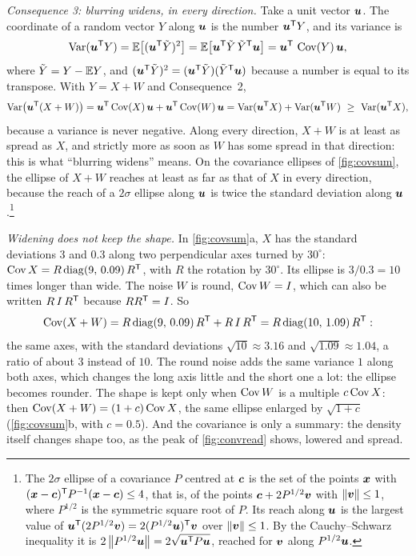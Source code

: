 \emph{Consequence 3: blurring widens, in every direction.} Take a unit
vector $\bm{u}$. The coordinate of a random vector $Y$ along $\bm{u}$ is
the number $\bm{u}^{\mathsf{T}} Y$, and its variance is
\[
  \operatorname{Var}(\bm{u}^{\mathsf{T}} Y)=\mathbb{E}\bigl[(\bm{u}^{\mathsf{T}}\tilde Y)^2\bigr]
  =\mathbb{E}\bigl[\bm{u}^{\mathsf{T}}\tilde Y\,\tilde Y^{\mathsf{T}}\bm{u}\bigr]
  =\bm{u}^{\mathsf{T}}\,\operatorname{Cov}(Y)\,\bm{u} ,
\]
where $\tilde Y=Y-\mathbb{E} Y$, and $(\bm{u}^{\mathsf{T}}\tilde Y)^2=(\bm{u}^{\mathsf{T}}\tilde
Y)(\tilde Y^{\mathsf{T}}\bm{u})$ because a number is equal to its transpose. With
$Y=X+W$ and Consequence~2,
\[
  \operatorname{Var}\bigl(\bm{u}^{\mathsf{T}}(X+W)\bigr)
  =\bm{u}^{\mathsf{T}}\operatorname{Cov}(X)\,\bm{u}+\bm{u}^{\mathsf{T}}\operatorname{Cov}(W)\,\bm{u}
  =\operatorname{Var}(\bm{u}^{\mathsf{T}} X)+\operatorname{Var}(\bm{u}^{\mathsf{T}} W)\ \ge\ \operatorname{Var}(\bm{u}^{\mathsf{T}} X),
\]
because a variance is never negative. Along every direction, $X+W$ is at
least as spread as $X$, and strictly more as soon as $W$ has some spread
in that direction: this is what ``blurring widens'' means. On the
covariance ellipses of \cref{fig:covsum}, the ellipse of $X+W$ reaches at
least as far as that of $X$ in every direction, because the reach of a
$2\sigma$ ellipse along $\bm{u}$ is twice the standard deviation along
$\bm{u}$.\footnote{The $2\sigma$ ellipse of a covariance $P$ centred at
$\bm{c}$ is the set of the points $\bm{x}$ with
$(\bm{x}-\bm{c})^{\mathsf{T}} P^{-1}(\bm{x}-\bm{c})\le4$, that is, of the
points $\bm{c}+2P^{1/2}\bm{v}$ with $\left\lVert \bm{v}\right\rVert\le1$, where
$P^{1/2}$ is the symmetric square root of $P$. Its reach along $\bm{u}$
is the largest value of $\bm{u}^{\mathsf{T}}(2P^{1/2}\bm{v})=2(P^{1/2}\bm{u})^{\mathsf{T}}\bm{v}$ over $\left\lVert \bm{v}\right\rVert\le1$. By the Cauchy--Schwarz
inequality it is $2\left\lVert P^{1/2}\bm{u}\right\rVert=2\sqrt{\bm{u}^{\mathsf{T}} P\bm{u}}$,
reached for $\bm{v}$ along $P^{1/2}\bm{u}$.}

\emph{Widening does not keep the shape.} In \cref{fig:covsum}a, $X$ has
the standard deviations $3$ and $0.3$ along two perpendicular axes turned
by $30^\circ$: $\operatorname{Cov} X=R\,\mathrm{diag}(9,\,0.09)\,R^{\mathsf{T}}$, with $R$ the
rotation by $30^\circ$. Its ellipse is $3/0.3=10$ times longer than wide.
The noise $W$ is round, $\operatorname{Cov} W=I$, which can also be written $R\,I\,R^{\mathsf{T}}$
because $RR^{\mathsf{T}}=I$. So
\[
  \operatorname{Cov}(X+W)=R\,\mathrm{diag}(9,\,0.09)\,R^{\mathsf{T}}+R\,I\,R^{\mathsf{T}}
  =R\,\mathrm{diag}(10,\,1.09)\,R^{\mathsf{T}} :
\]
the same axes, with the standard deviations $\sqrt{10}\approx3.16$ and
$\sqrt{1.09}\approx1.04$, a ratio of about $3$ instead of $10$. The round
noise adds the same variance $1$ along both axes, which changes the long
axis little and the short one a lot: the ellipse becomes rounder. The
shape is kept only when $\operatorname{Cov} W$ is a multiple $c\operatorname{Cov} X$: then
$\operatorname{Cov}(X+W)=(1+c)\operatorname{Cov} X$, the same ellipse enlarged by $\sqrt{1+c}$
(\cref{fig:covsum}b, with $c=0.5$). And the covariance is only a
summary: the density itself changes shape too, as the peak of
\cref{fig:convread} shows, lowered and spread.

